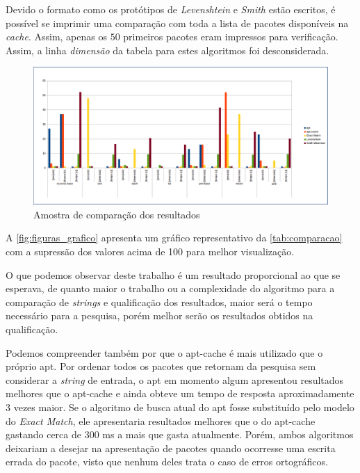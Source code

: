Devido o formato como os protótipos de \textit{Levenshtein} e \textit{Smith} estão escritos, é possível se imprimir uma comparação com toda a lista de pacotes disponíveis na \textit{cache}. Assim, apenas os $50$ primeiros pacotes eram impressos para verificação. Assim, a linha \textit{dimensão} da tabela para estes algoritmos foi desconsiderada.

\begin{figure}[h]
  \centering
	\includegraphics[width=\textwidth,angle=0]{figuras/grafico}
  \caption{Amostra de comparação dos resultados}
  \label{fig:figuras_grafico}
\end{figure}

A \autoref{fig:figuras_grafico} apresenta um gráfico representativo da \autoref{tab:comparacao} com a supressão dos valores acima de 100  para melhor visualização.

O que podemos observar deste trabalho é um resultado proporcional ao que se esperava, de quanto maior o trabalho ou a complexidade do algoritmo para a comparação de \textit{strings} e qualificação dos resultados, maior será o tempo necessário para a pesquisa, porém melhor serão os resultados obtidos na qualificação.

Podemos compreender também por que o {\code apt-cache} é mais utilizado que o próprio {\code apt}. Por ordenar todos os pacotes que retornam da pesquisa sem considerar a \textit{string} de entrada, o {\code apt} em momento algum apresentou resultados melhores que o {\code apt-cache} e ainda obteve um tempo de resposta aproximadamente 3 vezes maior. Se o algoritmo de busca atual do {\code apt} fosse substituído pelo modelo do \textit{Exact Match}, ele apresentaria resultados melhores que o do {\code apt-cache} gastando cerca de $300$ ms a mais que gasta atualmente. Porém, ambos algoritmos deixariam a desejar na apresentação de pacotes quando ocorresse uma escrita errada do pacote, visto que nenhum deles trata o caso de erros ortográficos.

